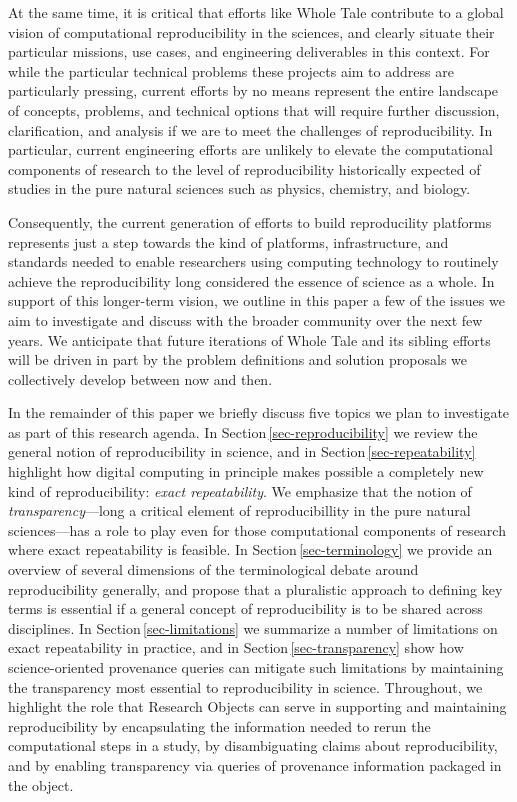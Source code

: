 At the same time, it is critical that efforts like Whole Tale contribute to a global
	vision of computational reproducibility in the sciences, and clearly situate
	their particular missions, use cases, and engineering deliverables in this context.
For while the particular technical problems these projects
	aim to address are particularly pressing, current efforts by no means
	represent the entire landscape of concepts, problems, and technical options
	that will require further discussion, clarification, and analysis if we are to meet
	the challenges of reproducibility.
In particular, current engineering efforts are unlikely to elevate the computational components
	of research to the level of reproducibility historically expected of studies in the
	pure natural sciences such as physics, chemistry, and biology.

Consequently, the current generation of efforts to build reproducility platforms represents
    just a step towards the kind of platforms, infrastructure, and standards
	needed to enable researchers using computing technology to routinely
	achieve the reproducibility long considered the essence of science as a whole.
In support of this longer-term vision, we outline in this paper
 a few of the issues we aim to investigate and discuss with the broader community over the next few years.
We anticipate that future iterations of Whole Tale and its sibling efforts
	will be driven in part by the problem definitions and solution proposals we collectively
	develop between now and then.

In the remainder of this paper we briefly discuss five topics we plan to investigate
	as part of this research agenda.
In Section\,\ref{sec-reproducibility} we review the general notion of
reproducibility in science, and in Section\,\ref{sec-repeatability}
	highlight how digital computing in principle makes possible a completely new kind of reproducibility:
	\emph{exact repeatability}.
We emphasize that the notion of \emph{transparency}---long a critical element of
	reproducibillity in the pure natural sciences---has a role to play even for those computational components
	of research where exact repeatability is feasible.
In Section\,\ref{sec-terminology} we provide an overview of several dimensions of the terminological debate around reproducibility
	generally, and propose that a pluralistic approach to defining key terms is essential if a general
	concept of reproducibility is to be shared across disciplines.
In Section\,\ref{sec-limitations} we summarize a number of limitations on exact repeatability in practice, and in Section\,\ref{sec-transparency}
	show how science-oriented provenance queries can mitigate such limitations by maintaining
 	the transparency most essential to reproducibility in science.
Throughout, we highlight the role that Research Objects \cite{bechhofer2013whya}
	can serve in supporting and maintaining reproducibility
	by encapsulating the information needed to rerun the computational steps in a study,
	by disambiguating claims about reproducibility,
	and by enabling transparency via queries of provenance information packaged in the object.



